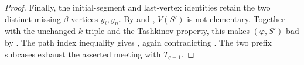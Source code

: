 \begin{proof}
Finally, the initial-segment and last-vertex identities retain the two
distinct missing-\(\beta\) vertices \(y_i,y_n\).  By
 and
, \(V(S')\) is not elementary.
Together with the unchanged \(k\)-triple and the Tashkinov property,
this makes \((\varphi,S')\) bad by .  The path
index inequality gives , again contradicting
.  The two prefix subcases exhaust the
asserted meeting with \(T_{q-1}\).
\end{proof}
